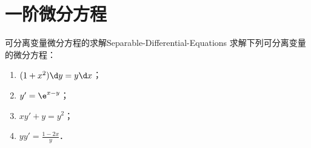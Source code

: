 \section{一阶微分方程}

\begin{problem}{可分离变量微分方程的求解}{Separable-Differential-Equations}
    求解下列可分离变量的微分方程：
    \begin{enumerate}
        \item $(1+x^2)\d y = y \d x$；
        \item $y' = \e^{x-y}$；
        \item $xy' + y = y^2$；
        \item $yy' = \frac{1-2x}{y}$．
    \end{enumerate}
\end{problem}

